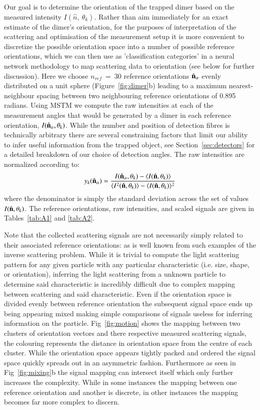 \documentclass[preprint,  3p]{elsarticle}
\begin{document}
Our goal is to determine the orientation of the trapped dimer based on the measured intensity $I(\hat{n}, \ \theta_k)$. Rather than aim immediately for an exact estimate of the dimer's orientation, for the purposes of interpretation of the scattering and optimisation of the measurement setup it is more convenient to discretize the possible orientation space into a number of possible reference orientations, which we can then use as 'classification categories' in a neural network methodology to map scattering data to orientation (see below for further discussion).  Here we choose $\textit{n}_{ref} \ = \ 30$ reference orientations $\hat{\bf n}_{\alpha}$  evenly distributed on a unit sphere \cite{Rey2006} (Figure~\ref{fig:dimer}b) leading to a maximum nearest-neighbour spacing between two neighbouring reference orientations of 0.895 radians. Using MSTM we compute the raw intensities at each of the measurement angles that would be generated by a dimer in each reference orientation, $I(\hat{\bf n}_{\alpha}, \theta_k)$. While the number and position of detection fibres is technically arbitrary there are several constraining factors that limit our ability to infer useful information from the trapped object, see Section~\ref{sec:detectors} for a detailed breakdown of our choice of detection angles. The raw intensities are normalized according to:
\begin{align}
\label{eq:scale}
  y_k(\hat{\bf n}_\alpha)
  = 
  \frac{I(\hat{\bf n}_\alpha, \theta_k) - \langle I(\hat{\bf n},\theta_k) \rangle } 
  {\langle I^2(\hat{\bf n},\theta_k) \rangle -\langle I(\hat{\bf n}, \theta_k)\rangle^2}
\end{align}
where the denominator is simply the standard deviation across the set of values $I(\hat{\bf n}, \theta_k)$. The reference orientations, raw intensities, and scaled signals are given in Tables~\ref{tab:A1} and \ref{tab:A2}. 

Note that the collected scattering signals are not necessarily simply related to their associated reference orientations: as is well known from such examples of the inverse scattering problem. While it is trivial to compute the light scattering pattern for any given particle with any particular characteristic (i.e. size, shape, or orientation), inferring the light scattering from a unknown particle to determine said characteristic is incredibly difficult due to complex mapping between scattering and said characteristic. Even if the orientation space is divided evenly between reference orientation the subsequent signal space ends up being appearing mixed making simple comparisons of signals useless for inferring information on the particle. Fig~\ref{fig:motion} shows the mapping between two clusters of orientation vectors and there respective measured scattering signals, the colouring represents the distance in orientation space from the centre of each cluster. While the orientation space appears tightly packed and ordered the signal space quickly spreads out in an asymmetric fashion. Furthermore as seen in Fig~\ref{fig:mixing}b the signal mapping can intersect itself which only further increases the complexity. While in some instances the mapping between one reference orientation and another is discrete, in other instances the mapping becomes far more complex to discern. 
\end{document}

